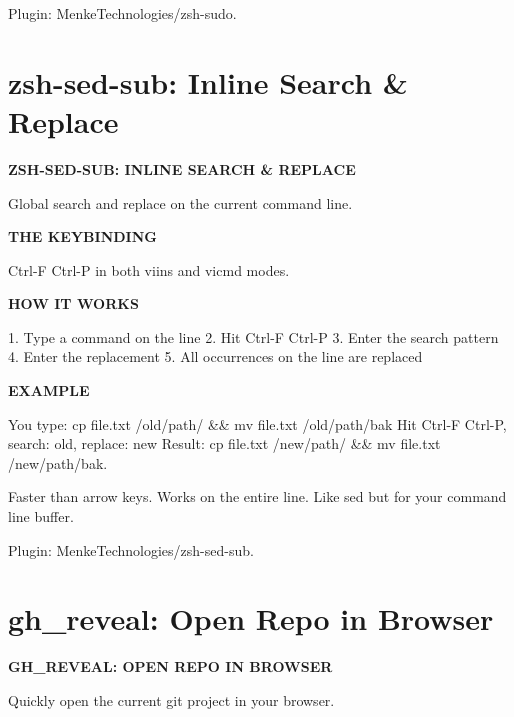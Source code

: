 \documentclass[11pt,a4paper,twoside]{book}
\begin{document}
Plugin: MenkeTechnologies/zsh-sudo.


\vspace{16pt}

\section{zsh-sed-sub: Inline Search \& Replace}


\vspace{10pt}
{\large\bfseries\color{neoncyan} ZSH-SED-SUB: INLINE SEARCH \& REPLACE}\vspace{6pt}

Global search and replace on the current command line.


\vspace{12pt}
{\bfseries\color{neonyellow} THE KEYBINDING}\vspace{4pt}

Ctrl-F Ctrl-P   in both viins and vicmd modes.


\vspace{12pt}
{\bfseries\color{neonyellow} HOW IT WORKS}\vspace{4pt}

1. Type a command on the line 2. Hit Ctrl-F Ctrl-P 3. Enter the search pattern 4. Enter the replacement 5. All occurrences on the line are replaced


\vspace{12pt}
{\bfseries\color{neonyellow} EXAMPLE}\vspace{4pt}

You type:  cp file.txt /old/path/ \&\& mv file.txt /old/path/bak Hit Ctrl-F Ctrl-P, search: old, replace: new Result:   cp file.txt /new/path/ \&\& mv file.txt /new/path/bak.

Faster than arrow keys. Works on the entire line. Like sed but for your command line buffer.

Plugin: MenkeTechnologies/zsh-sed-sub.


\vspace{16pt}

\section{gh\_reveal: Open Repo in Browser}


\vspace{10pt}
{\large\bfseries\color{neoncyan} GH\_REVEAL: OPEN REPO IN BROWSER}\vspace{6pt}

Quickly open the current git project in your browser.
\end{document}
